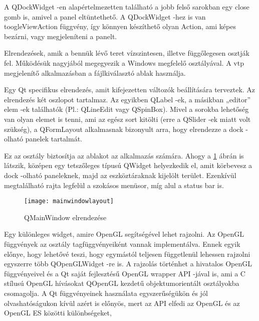 \begin{sloppypar}
\begin{description}[font=\normalfont\itshape\space]
A {\ttfamily QDockWidget} -en alapértelmezetten található a jobb felső sarokban 
egy close gomb is, amivel a panel eltüntethető. 
A {\ttfamily QDockWidget} -hez is van {\ttfamily toogleViewAction} függvény, 
így könnyen készíthető olyan Action, 
ami képes bezárni, vagy megjeleníteni a panelt.
\item [QHBoxLayout, QVBoxLayout:] 
Elrendezések, amik a bennük lévő teret vízszintesen, 
illetve függőlegesen osztják fel. 
Működésük nagyjából megegyezik a Windows megfelelő osztályával. 
A vtp megjelenítő alkalmazásban a fájlkiválasztó ablak használja.
\item [QFormLayout:] 
Egy Qt specifikus elrendezés, 
amit kifejezetten változók beállítására terveztek. 
Az elrendezés két oszlopot tartalmaz. 
Az egyikben {\ttfamily QLabel} -ek, 
a másikban „editor” elem -ek találhatók 
(Pl.: {\ttfamily QLineEdit} vagy {\ttfamily QSpinBox}). 
Mivel a sorokba lehetőség van olyan elemet is tenni, 
ami az egész sort kitölti (erre a {\ttfamily QSlider} -ek miatt volt szükség), 
a {\ttfamily QFormLayout} alkalmasnak bizonyult arra, 
hogy elrendezze a dock -olható panelek tartalmát.
\item [QMainWindow:] 
Ez az osztály biztosítja az ablakot az alkalmazás számára. 
Ahogy a \ref{fig:x mainWindowsLayout} ábrán is látszik, 
középen egy tetszőleges típusú QWidget helyezkedik el, 
amit körbevesz a dock -olható paneleknek, 
majd az eszköztáraknak kijelölt terület. 
Ezenkívül megtalálható rajta legfelül a szokásos menüsor, 
míg alul a status bar is.
\par
\begin{figure}[!htb]
\centering
\texttt{[image: mainwindowlayout]}
\caption{QMainWindow elrendezése \cite{mainwindowlayout}}
\label{fig:x mainWindowsLayout}
\end{figure}
\par
\item [QOpenGLWidget:] 
Egy különleges widget, 
amire OpenGL segítségével lehet rajzolni. 
Az OpenGL függvények az osztály tagfüggvényeiként vannak implementálva. 
Ennek egyik előnye, 
hogy lehetővé teszi, 
hogy egymástól teljesen függetlenül
lehessen rajzolni egyszerre több 
QOpenGLWidget -re is.
A rajzolás történhet a hivatalos OpenGL függvényeivel
és a Qt saját fejlesztésű OpenGL wrapper API -jával is,
ami a C stílusú OpenGL hívásokat 
QOpenGL kezdetű objektumorientált osztályokba csomagolja. 
A Qt függvényeinek használata egyszerűségükön 
és jól olvashatóságukon kívül azért is előnyös, 
mert az API elfedi az OpenGL és az OpenGL ES közötti különbségeket, 

\end{description}
\end{sloppypar}
